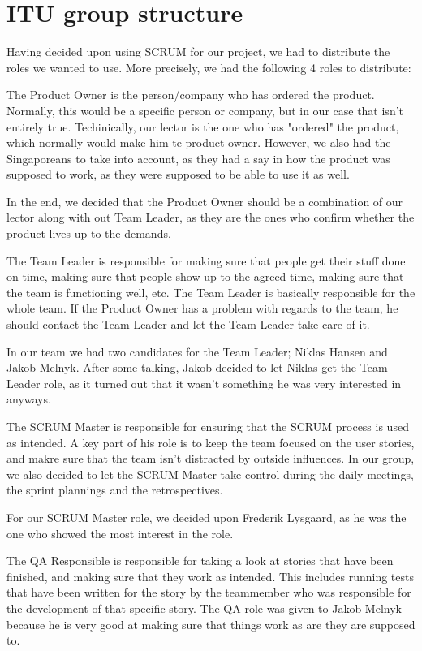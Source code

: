 \section{ITU group structure}
\label{Collaboration_ITU}
Having decided upon using SCRUM for our project, we had to distribute the roles we wanted to use. More precisely, we had the following 4 roles to distribute: 
\begin{my_description}
\item[Product Owner]
The Product Owner is the person/company who has ordered the product. Normally, this would be a specific person or company, but in our case that isn't entirely true. Techinically, our lector is the one who has "ordered" the product, which normally would make him te product owner. However, we also had the Singaporeans to take into account, as they had a say in how the product was supposed to work, as they were supposed to be able to use it as well.

In the end, we decided that the Product Owner should be a combination of our lector along with out Team Leader, as they are the ones who confirm whether the product lives up to the demands.

\item[Team Leader]
The Team Leader is responsible for making sure that people get their stuff done on time, making sure that people show up to the agreed time, making sure that the team is functioning well, etc. The Team Leader is basically responsible for the whole team. If the Product Owner has a problem with regards to the team, he should contact the Team Leader and let the Team Leader take care of it.

In our team we had two candidates for the Team Leader; Niklas Hansen and Jakob Melnyk. After some talking, Jakob decided to let Niklas get the Team Leader role, as it turned out that it wasn't something he was very interested in anyways.

\item[SCRUM Master]
The SCRUM Master is responsible for ensuring that the SCRUM process is used as intended. A key part of his role is to keep the team focused on the user stories, and makre sure that the team isn't distracted by outside influences. In our group, we also decided to let the SCRUM Master take control during the daily meetings, the sprint plannings and the retrospectives.

For our SCRUM Master role, we decided upon Frederik Lysgaard, as he was the one who showed the most interest in the role.

\item[QA Responsible]
The QA Responsible is responsible for taking a look at stories that have been finished, and making sure that they work as intended. This includes running tests that have been written for the story by the teammember who was responsible for the development of that specific story.
The QA role was given to Jakob Melnyk because he is very good at making sure that things work as are they are supposed to.
\end{my_description}

